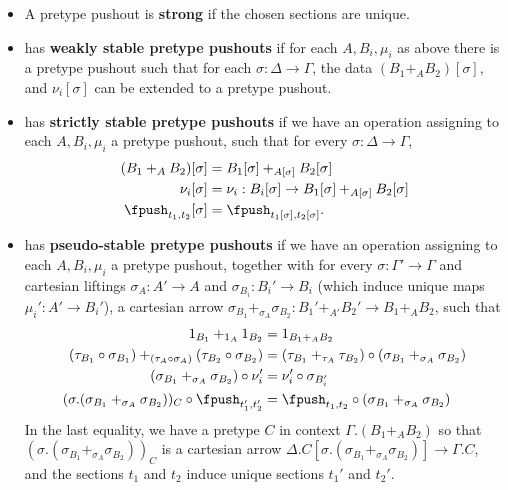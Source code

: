 \documentclass{amsart}
\begin{document}
\begin{defn}
\begin{itemize}
\begin{itemize}
    \end{itemize}
  \item A pretype pushout is \textbf{strong} if the chosen sections are unique.
  \item \E has \textbf{weakly stable pretype pushouts} if for each $A,B_i,\mu_i$ as above there is a pretype pushout such that for each $\sigma:\Delta\to\Gamma$, the data $(B_1 +_A B_2)[\sigma]$, and $\nu_i[\sigma]$ can be extended to a pretype pushout.
  \item \E has \textbf{strictly stable pretype pushouts} if we have an operation assigning to each $A,B_i,\mu_i$ a pretype pushout, such that for every $\sigma:\Delta\to\Gamma$,
    \begin{align*}
      (B_1 +_A B_2)[\sigma] &= B_1[\sigma] +_{A[\sigma]} B_2[\sigma]\\
      \nu_i[\sigma] &= \nu_i : B_i[\sigma] \to B_1[\sigma] +_{A[\sigma]} B_2[\sigma]\\
      \fpush_{t_1,t_2}[\sigma] &= \fpush_{t_1[\sigma],t_2[\sigma]}.
    \end{align*}
  \item \E has \textbf{pseudo-stable pretype pushouts} if we have an operation assigning to each $A,B_i,\mu_i$ a pretype pushout, together with for every $\sigma:\Gamma'\to\Gamma$ and cartesian liftings $\sigma_A:A'\to A$ and $\sigma_{B_i} : B_i' \to B_i$ (which induce unique maps $\mu_i' : A' \to B_i'$), a cartesian arrow $\sigma_{B_1} +_{\sigma_A} \sigma_{B_2} : B_1' +_{A'} B_2' \to B_1 +_A B_2$, such that
    \begin{align*}
      1_{B_1} +_{1_A} 1_{B_2} &= 1_{B_1 +_A B_2}\\
      (\tau_{B_1}\circ \sigma_{B_1}) +_{(\tau_A \circ \sigma_A)} (\tau_{B_2}\circ \sigma_{B_2})
      &= (\tau_{B_1} +_{\tau_A} \tau_{B_2}) \circ (\sigma_{B_1} +_{\sigma_A} \sigma_{B_2})\\
      (\sigma_{B_1} +_{\sigma_A} \sigma_{B_2}) \circ \nu_i' &= \nu_i' \circ \sigma_{B_i'}\\
      (\sigma.(\sigma_{B_1} +_{\sigma_A} \sigma_{B_2}))_C \circ \fpush_{t_1',t_2'} &= \fpush_{t_1,t_2} \circ (\sigma_{B_1} +_{\sigma_A} \sigma_{B_2})
    \end{align*}
    In the last equality, we have a pretype $C$ in context $\Gamma.(B_1 +_A B_2)$ so that $(\sigma.(\sigma_{B_1} +_{\sigma_A} \sigma_{B_2}))_C$ is a cartesian arrow $\Delta.C[\sigma.(\sigma_{B_1} +_{\sigma_A} \sigma_{B_2})] \to \Gamma.C$, and the sections $t_1$ and $t_2$ induce unique sections $t_1'$ and $t_2'$.
  \end{itemize}
\end{defn}
\end{document}
